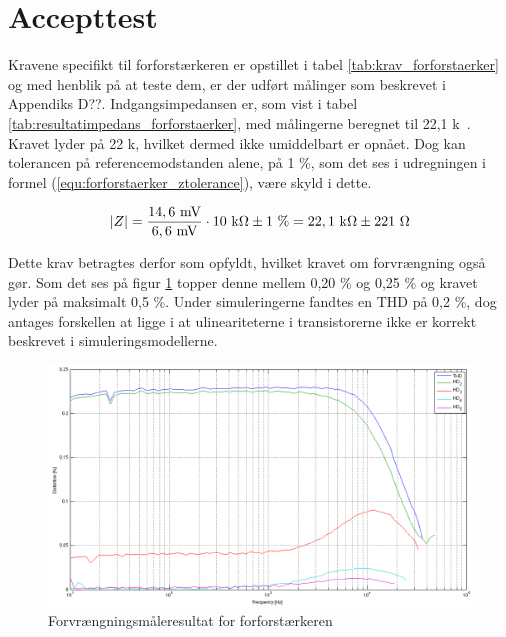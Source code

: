 \section{Accepttest}
\label{forforstaerker_accepttest}

Kravene specifikt til forforstærkeren er opstillet i tabel \ref{tab:krav_forforstaerker} og med henblik på at teste dem, er der udført målinger som beskrevet i Appendiks D??. Indgangsimpedansen er, som vist i tabel \ref{tab:resultatimpedans_forforstaerker}, med målingerne beregnet til 22,1 k\ohm~. Kravet lyder på 22 k\ohm, hvilket dermed ikke umiddelbart er opnået. Dog kan tolerancen på referencemodstanden alene, på 1 \%, som det ses i udregningen i formel (\ref{equ:forforstaerker_ztolerance}), være skyld i dette.

\begin{equation}
\label{equ:forforstaerker_ztolerance}
\vert Z \vert = \frac{\mathrm{14,6~mV}}{\mathrm{6,6~mV}} \cdot \mathrm{10~k\ohm} \pm 1~\% =  \mathrm{22,1~k\ohm} \pm 221~\ohm
\end{equation}

Dette krav betragtes derfor som opfyldt, hvilket kravet om forvrængning også gør. Som det ses på figur \ref{fig:accepttest-thdresultat-forforstaerker} topper denne mellem 0,20 \% og 0,25 \% og kravet lyder på maksimalt 0,5 \%. Under simuleringerne fandtes en THD på 0,2 \%, dog antages forskellen at ligge i at ulineariteterne i transistorerne ikke er korrekt beskrevet i simuleringsmodellerne. 

\begin{figure}[h]
\centering
\includegraphics[scale=0.3]{maalerapporter/forforstaerker/thd-forforstaerker.png}
\caption{Forvrængningsmåleresultat for forforstærkeren}
\label{fig:accepttest-thdresultat-forforstaerker}
\end{figure}

